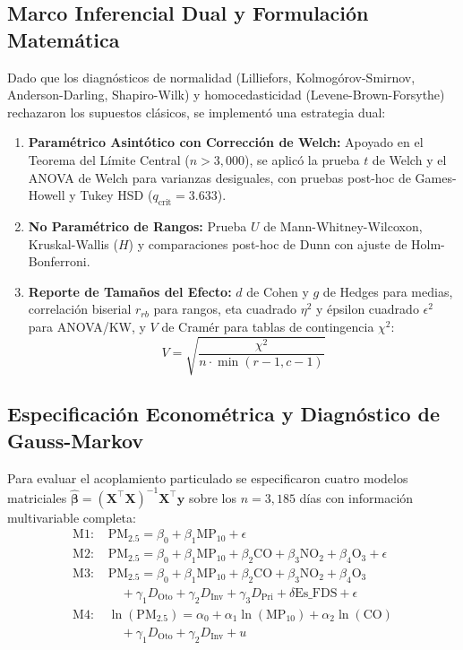 \documentclass[10pt,twocolumn,a4paper]{article}
\begin{document}
\subsection{Marco Inferencial Dual y Formulación Matemática}
Dado que los diagnósticos de normalidad (Lilliefors, Kolmogórov-Smirnov, Anderson-Darling, Shapiro-Wilk) y homocedasticidad (Levene-Brown-Forsythe) rechazaron los supuestos clásicos, se implementó una estrategia dual:
\begin{enumerate}
    \item \textbf{Paramétrico Asintótico con Corrección de Welch:} Apoyado en el Teorema del Límite Central ($n > 3,000$), se aplicó la prueba $t$ de Welch y el ANOVA de Welch para varianzas desiguales, con pruebas post-hoc de Games-Howell y Tukey HSD ($q_{\text{crit}} = 3.633$).
    \item \textbf{No Paramétrico de Rangos:} Prueba $U$ de Mann-Whitney-Wilcoxon, Kruskal-Wallis ($H$) y comparaciones post-hoc de Dunn con ajuste de Holm-Bonferroni.
    \item \textbf{Reporte de Tamaños del Efecto:} $d$ de Cohen y $g$ de Hedges para medias, correlación biserial $r_{rb}$ para rangos, eta cuadrado $\eta^2$ y épsilon cuadrado $\epsilon^2$ para ANOVA/KW, y $V$ de Cramér para tablas de contingencia $\chi^2$:
    \begin{equation}
        V = \sqrt{\frac{\chi^2}{n \cdot \min(r - 1, c - 1)}}
    \end{equation}
\end{enumerate}

\subsection{Especificación Econométrica y Diagnóstico de Gauss-Markov}
Para evaluar el acoplamiento particulado se especificaron cuatro modelos matriciales $\hat{\boldsymbol{\beta}} = (\mathbf{X}^\top \mathbf{X})^{-1} \mathbf{X}^\top \mathbf{y}$ sobre los $n = 3,185$ días con información multivariable completa:
\begin{align}
    \text{M1: } & \text{PM}_{2.5} = \beta_0 + \beta_1 \text{MP}_{10} + \epsilon \\
    \text{M2: } & \text{PM}_{2.5} = \beta_0 + \beta_1 \text{MP}_{10} + \beta_2 \text{CO} + \beta_3 \text{NO}_2 + \beta_4 \text{O}_3 + \epsilon \\
    \text{M3: } & \text{PM}_{2.5} = \beta_0 + \beta_1 \text{MP}_{10} + \beta_2 \text{CO} + \beta_3 \text{NO}_2 + \beta_4 \text{O}_3 \nonumber \\
    & \quad + \gamma_1 D_{\text{Oto}} + \gamma_2 D_{\text{Inv}} + \gamma_3 D_{\text{Pri}} + \delta \text{Es\_FDS} + \epsilon \\
    \text{M4: } & \ln(\text{PM}_{2.5}) = \alpha_0 + \alpha_1 \ln(\text{MP}_{10}) + \alpha_2 \ln(\text{CO}) \nonumber \\
    & \quad + \gamma_1 D_{\text{Oto}} + \gamma_2 D_{\text{Inv}} + u
\end{align}
\end{document}
